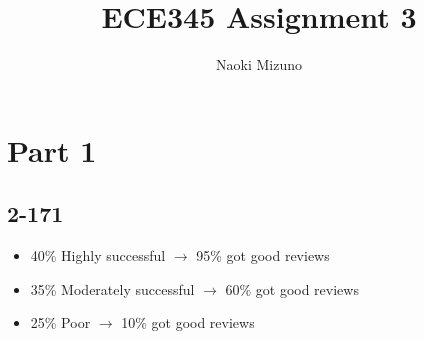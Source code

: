 \documentclass{article}
\title{ECE345 Assignment 3}
\author{Naoki Mizuno}
\begin{document}
\maketitle

\section*{Part 1}
\subsection*{2-171}
\begin{itemize}
    \item 40\% Highly successful $\rightarrow$ 95\% got good reviews
    \item 35\% Moderately successful $\rightarrow$ 60\% got good reviews
    \item 25\% Poor $\rightarrow$ 10\% got good reviews
\end{itemize}
\end{document}
